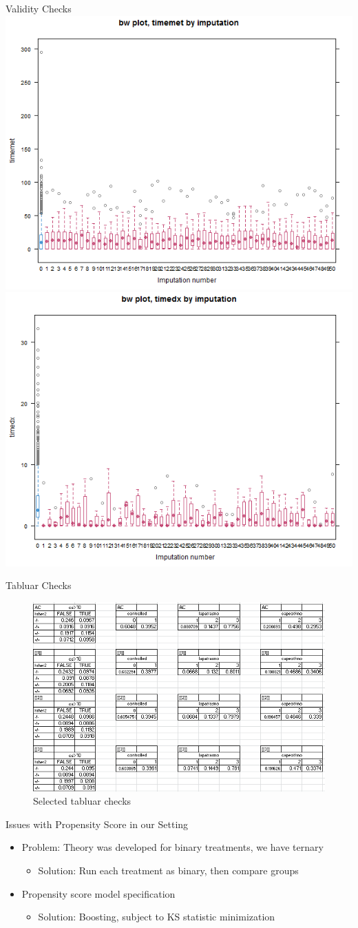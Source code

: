 \begin{frame}{Validity Checks}
 \includegraphics[width=.5\textwidth]{bw_timemet}%
\includegraphics[width=.5\textwidth]{bw_timedx} 
\end{frame}

\begin{frame}{Tabluar Checks}
 \begin{figure}[h!]
  \centering
\includegraphics[width=.8\textwidth]{tabchecks} 
  \caption{Selected tabluar checks}
\label{fig:tabcheck}
\end{figure}

\end{frame}


\begin{frame}{Issues with Propensity Score in our Setting}
\begin{itemize}
 \item Problem: Theory was developed for binary treatments, we have ternary
 \begin{itemize}
  \item Solution: Run each treatment as binary, then compare groups
 \end{itemize}
\item Propensity score model specification
\begin{itemize}
 \item Solution: Boosting, subject to KS statistic minimization
\end{itemize}
\end{itemize}
 
\end{frame}
